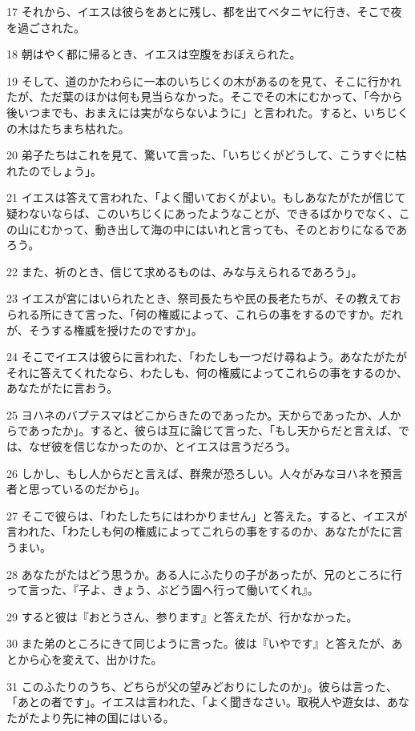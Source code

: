 \par 17 それから、イエスは彼らをあとに残し、都を出てベタニヤに行き、そこで夜を過ごされた。
\par 18 朝はやく都に帰るとき、イエスは空腹をおぼえられた。
\par 19 そして、道のかたわらに一本のいちじくの木があるのを見て、そこに行かれたが、ただ葉のほかは何も見当らなかった。そこでその木にむかって、「今から後いつまでも、おまえには実がならないように」と言われた。すると、いちじくの木はたちまち枯れた。
\par 20 弟子たちはこれを見て、驚いて言った、「いちじくがどうして、こうすぐに枯れたのでしょう」。
\par 21 イエスは答えて言われた、「よく聞いておくがよい。もしあなたがたが信じて疑わないならば、このいちじくにあったようなことが、できるばかりでなく、この山にむかって、動き出して海の中にはいれと言っても、そのとおりになるであろう。
\par 22 また、祈のとき、信じて求めるものは、みな与えられるであろう」。
\par 23 イエスが宮にはいられたとき、祭司長たちや民の長老たちが、その教えておられる所にきて言った、「何の権威によって、これらの事をするのですか。だれが、そうする権威を授けたのですか」。
\par 24 そこでイエスは彼らに言われた、「わたしも一つだけ尋ねよう。あなたがたがそれに答えてくれたなら、わたしも、何の権威によってこれらの事をするのか、あなたがたに言おう。
\par 25 ヨハネのバプテスマはどこからきたのであったか。天からであったか、人からであったか」。すると、彼らは互に論じて言った、「もし天からだと言えば、では、なぜ彼を信じなかったのか、とイエスは言うだろう。
\par 26 しかし、もし人からだと言えば、群衆が恐ろしい。人々がみなヨハネを預言者と思っているのだから」。
\par 27 そこで彼らは、「わたしたちにはわかりません」と答えた。すると、イエスが言われた、「わたしも何の権威によってこれらの事をするのか、あなたがたに言うまい。
\par 28 あなたがたはどう思うか。ある人にふたりの子があったが、兄のところに行って言った、『子よ、きょう、ぶどう園へ行って働いてくれ』。
\par 29 すると彼は『おとうさん、参ります』と答えたが、行かなかった。
\par 30 また弟のところにきて同じように言った。彼は『いやです』と答えたが、あとから心を変えて、出かけた。
\par 31 このふたりのうち、どちらが父の望みどおりにしたのか」。彼らは言った、「あとの者です」。イエスは言われた、「よく聞きなさい。取税人や遊女は、あなたがたより先に神の国にはいる。
